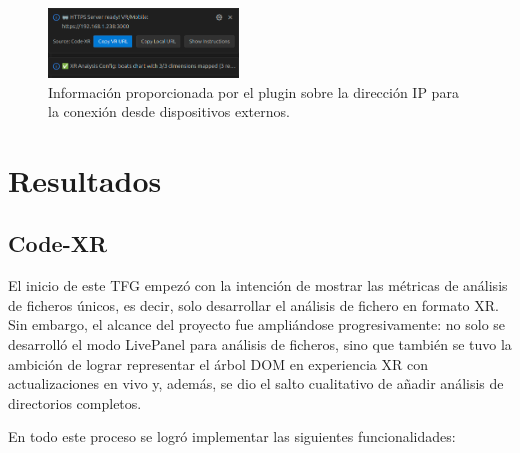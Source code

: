 \documentclass[a4paper, 12pt]{book}
\begin{document}
\begin{figure}[H]
\centering
\includegraphics[width=0.45\textwidth]{img/ip-connection-info.png}
\caption{Información proporcionada por el plugin sobre la dirección IP para la conexión desde dispositivos externos.}
\label{fig:ip-connection-info}
\end{figure}



\cleardoublepage
\chapter{Resultados}
\label{chap:resultados}

\section{Code-XR}
\label{sec:codexr-resultados}

El inicio de este TFG empezó con la intención de mostrar las métricas de análisis de ficheros únicos, es decir, solo desarrollar el análisis de fichero en formato XR. Sin embargo, el alcance del proyecto fue ampliándose progresivamente: no solo se desarrolló el modo LivePanel para análisis de ficheros, sino que también se tuvo la ambición de lograr representar el árbol DOM en experiencia XR con actualizaciones en vivo y, además, se dio el salto cualitativo de añadir análisis de directorios completos.

En todo este proceso se logró implementar las siguientes funcionalidades:
\end{document}
